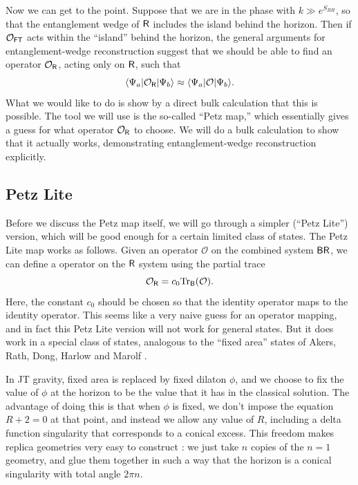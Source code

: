 \documentclass[12pt]{article}
\newcommand{\be}{\begin{equation}}
\newcommand{\ee}{\end{equation}}
\numberwithin{equation}{section}
\def\tr{\text{Tr}}
\begin{document}
Now we can get to the point. Suppose that we are in the phase with $k \gg e^{S_{BH}}$, so that the entanglement wedge of $\sf{R}$ includes the island behind the horizon. Then if $\mathcal{O}_{\sf{FT}}$ acts within the ``island'' behind the horizon, the general arguments for entanglement-wedge reconstruction suggest that we should be able to find an operator $\mathcal{O}_{\sf{R}}$, acting only on $\sf{R}$, such that 
\be
\langle \Psi_a|\mathcal{O}_{\sf{R}}|\Psi_b\rangle \approx \langle \Psi_a|\mathcal{O}|\Psi_b\rangle.\label{toCheck}
\ee
What we would like to do is show by a direct bulk calculation that this is possible. The tool we will use is the so-called ``Petz map,'' which essentially gives a guess for what operator $\mathcal{O}_{\sf{R}}$ to choose. We will do a bulk calculation to show that it actually works, demonstrating entanglement-wedge reconstruction explicitly.


\subsection{Petz Lite} \label{sec:petzlite}
Before we discuss the Petz map itself, we will go through a simpler (``Petz Lite'') version, which will be good enough for a certain limited class of states. The Petz Lite map works as follows. Given an operator $\mathcal{O}$ on the combined system $\sf{BR}$, we can define a operator on the $\sf{R}$ system using the partial trace
\be
\mathcal{O}_{\sf{R}} = c_0\tr_{\sf{B}}(\mathcal{O}).\label{petzLITE}
\ee
Here, the constant $c_0$ should be chosen so that the identity operator maps to the identity operator. This seems like a very naive guess for an operator mapping, and in fact this Petz Lite version will not work for general states. But it does work in a special class of states, analogous to the ``fixed area'' states of Akers, Rath, Dong, Harlow and Marolf \cite{Akers:2018fow,Dong:2018seb}.

In JT gravity, fixed area is replaced by fixed dilaton $\phi$, and we choose to fix the value of $\phi$ at the horizon to be the value that it has in the classical solution. The advantage of doing this is that when $\phi$ is fixed, we don't impose the equation $R + 2 = 0$ at that point, and instead we allow any value of $R$, including a delta function singularity that corresponds to a conical excess. This freedom makes replica geometries very easy to construct \cite{Akers:2018fow,Dong:2018seb}: we just take $n$ copies of the $n = 1$ geometry, and glue them together in such a way that the horizon is a conical singularity with total angle $2\pi n$.
\end{document}
